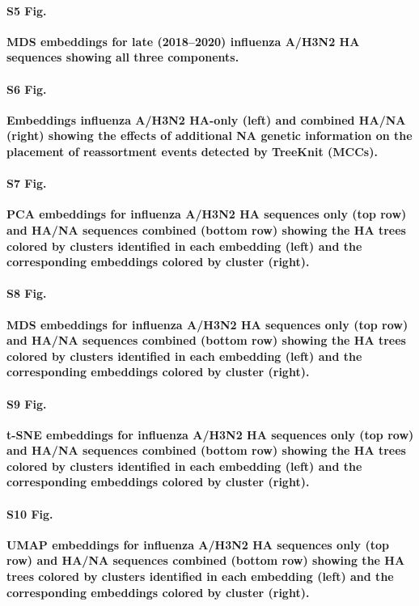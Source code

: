 \documentclass[10pt,letterpaper]{article}
\begin{document}
\paragraph*{S5 Fig.}
\label{S5_Fig_late_flu_mds_embeddings}
{\bf MDS embeddings for late (2018--2020) influenza A/H3N2 HA sequences showing all three components.}

\paragraph*{S6 Fig.}
\label{S6_Fig_full_ha_na_embeddings}
{\bf Embeddings influenza A/H3N2 HA-only (left) and combined HA/NA (right) showing the effects of additional NA genetic information on the placement of reassortment events detected by TreeKnit (MCCs).}

\paragraph*{S7 Fig.}
\label{S7_Fig_flu_ha_na_pca_embeddings}
{\bf PCA embeddings for influenza A/H3N2 HA sequences only (top row) and HA/NA sequences combined (bottom row) showing the HA trees colored by clusters identified in each embedding (left) and the corresponding embeddings colored by cluster (right).}

\paragraph*{S8 Fig.}
\label{S8_Fig_flu_ha_na_mds_embeddings}
{\bf MDS embeddings for influenza A/H3N2 HA sequences only (top row) and HA/NA sequences combined (bottom row) showing the HA trees colored by clusters identified in each embedding (left) and the corresponding embeddings colored by cluster (right).}

\paragraph*{S9 Fig.}
\label{S9_Fig_flu_ha_na_tsne_embeddings}
{\bf t-SNE embeddings for influenza A/H3N2 HA sequences only (top row) and HA/NA sequences combined (bottom row) showing the HA trees colored by clusters identified in each embedding (left) and the corresponding embeddings colored by cluster (right).}

\paragraph*{S10 Fig.}
\label{S10_Fig_flu_ha_na_umap_embeddings}
{\bf UMAP embeddings for influenza A/H3N2 HA sequences only (top row) and HA/NA sequences combined (bottom row) showing the HA trees colored by clusters identified in each embedding (left) and the corresponding embeddings colored by cluster (right).}
\end{document}
